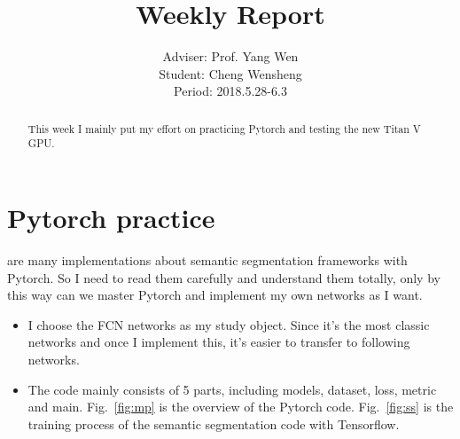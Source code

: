 \documentclass[]{IEEEtran}
\begin{document}
	\title{Weekly Report}
	\author{Adviser: Prof. Yang Wen \\Student: Cheng Wensheng\\ Period: 2018.5.28-6.3
	}
	\maketitle

\begin{abstract}
	This week I mainly put my effort on practicing Pytorch and testing the new Titan V GPU. 
\end{abstract}

\section{Pytorch practice}
	 are many implementations about semantic segmentation frameworks with Pytorch. So I need to read them carefully and understand them totally, only by this way can we master Pytorch and implement my own networks as I want.
	\begin{itemize}
		\item I choose the FCN networks as my study object. Since it's the most classic networks and once I implement this, it's easier to transfer to following networks.
		\item The code mainly consists of 5 parts, including models, dataset, loss, metric and main. Fig.~\ref{fig:mp} is the overview of the Pytorch code. Fig.~\ref{fig:ss} is the training process of the semantic segmentation code with Tensorflow.
	\end{itemize}

\end{document}
